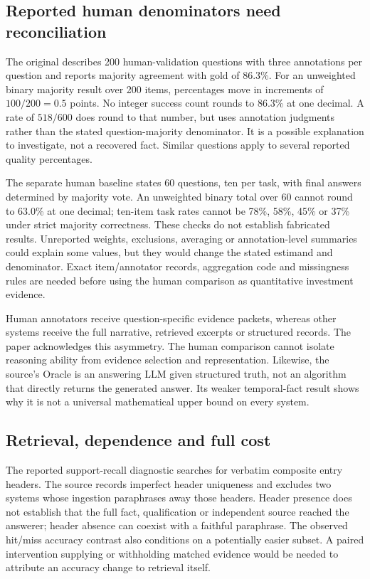 \subsection{Reported human denominators need reconciliation}
\label{eq:exec23-recon-denominators}
The original describes 200 human-validation questions with three annotations
per question and reports majority agreement with gold of 86.3\%. For an
unweighted binary majority result over 200 items, percentages move in
increments of $100/200=0.5$ points. No integer success count rounds to
86.3\% at one decimal. A rate of $518/600$ does round to that number, but
uses annotation judgments rather than the stated question-majority
 denominator. It is a possible explanation to investigate, not a recovered
fact. Similar questions apply to several reported quality percentages.
\citep{exec23_recon_original,exec23_recon_reference}

The separate human baseline states 60 questions, ten per task, with final
answers determined by majority vote. An unweighted binary total over 60
cannot round to 63.0\% at one decimal; ten-item task rates cannot be 78\%,
58\%, 45\% or 37\% under strict majority correctness. These checks do not
establish fabricated results. Unreported weights, exclusions, averaging or
annotation-level summaries could explain some values, but they would change
the stated estimand and denominator. Exact item/annotator records, aggregation
code and missingness rules are needed before using the human comparison as
quantitative investment evidence. \citep{exec23_recon_original,exec23_recon_reference}

Human annotators receive question-specific evidence packets, whereas other
systems receive the full narrative, retrieved excerpts or structured records.
The paper acknowledges this asymmetry. The human comparison cannot isolate
reasoning ability from evidence selection and representation. Likewise, the
source's Oracle is an answering LLM given structured truth, not an algorithm
that directly returns the generated answer. Its weaker temporal-fact result
shows why it is not a universal mathematical upper bound on every system.
\citep{exec23_recon_original}

\subsection{Retrieval, dependence and full cost}
The reported support-recall diagnostic searches for verbatim composite entry
headers. The source records imperfect header uniqueness and excludes two
systems whose ingestion paraphrases away those headers. Header presence does
not establish that the full fact, qualification or independent source reached
the answerer; header absence can coexist with a faithful paraphrase. The
observed hit/miss accuracy contrast also conditions on a potentially easier
subset. A paired intervention supplying or withholding matched evidence would
be needed to attribute an accuracy change to retrieval itself.
\citep{exec23_recon_original}

